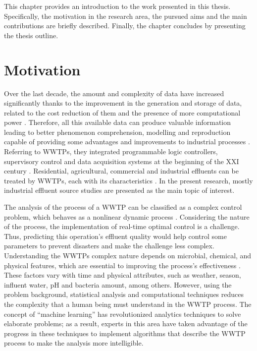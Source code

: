 This chapter provides an introduction to the work presented in this thesis. Specifically, the motivation in the research area, the pursued aims and the main contributions are briefly described. Finally, the chapter concludes by presenting the thesis outline.

\section{Motivation}
\label{s:Motivation}

Over the last decade, the amount and complexity of data have increased significantly thanks to the improvement in the generation and storage of data, related to the cost reduction of them and the presence of more computational power \cite{Romero2017}. Therefore, all this available data can produce valuable information leading to better phenomenon comprehension, modelling and reproduction capable of providing some advantages and improvements to industrial processes \cite{Sbroiavacca2018}. Referring to \ac{WWTP}s, they integrated programmable logic controllers, supervisory control and data acquisition systems at the beginning of the XXI century \cite{Newhart2019}. Residential, agricultural, commercial and industrial effluents can be treated by \ac{WWTP}s, each with its characteristics \cite{Nourani2018}. In the present research, mostly industrial effluent source studies are presented as the main topic of interest.

The analysis of the process of a \ac{WWTP} can be classified as a complex control problem, which behaves as a nonlinear dynamic process \cite{Pang2019}. Considering the nature of the process, the implementation of real-time optimal control is a challenge. Thus, predicting this operation's effluent quality would help control some parameters to prevent disasters and make the challenge less complex. Understanding the \ac{WWTP}s complex nature depends on microbial, chemical, and physical features, which are essential to improving the process's effectiveness \cite{Li2013}. These factors vary with time and physical attributes, such as weather, season, influent water, pH and bacteria amount, among others. However, using the problem background, statistical analysis and computational techniques reduces the complexity that a human being must understand in the \ac{WWTP} process. The concept of “machine learning” has revolutionized analytics techniques to solve elaborate problems; as a result, experts in this area have taken advantage of the progress in these techniques to implement algorithms that describe the \ac{WWTP} process to make the analysis more intelligible.

